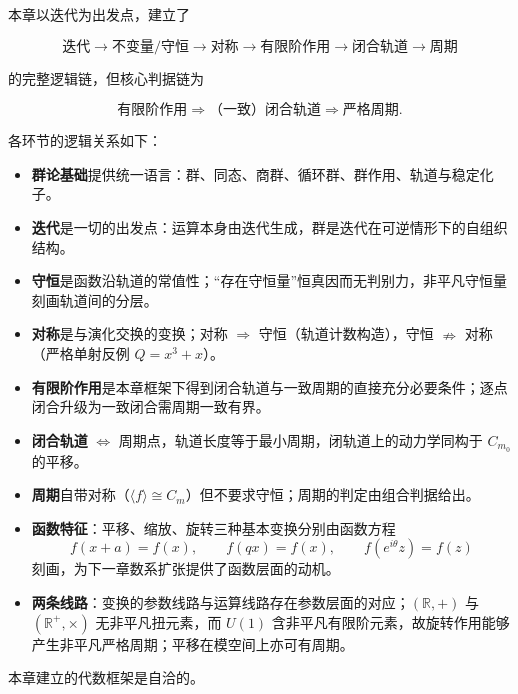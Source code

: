 \begin{remark}[本章总结]\label{rem:chapter_summary}
本章以迭代为出发点，建立了

\[
\text{迭代}\to\text{不变量/守恒}\to\text{对称}\to\text{有限阶作用}\to\text{闭合轨道}\to\text{周期}
\]

的完整逻辑链，但核心判据链为

\[
\text{有限阶作用}\Longrightarrow\text{（一致）闭合轨道}\Longrightarrow\text{严格周期}.
\]

各环节的逻辑关系如下：
\begin{itemize}
    \item \textbf{群论基础}提供统一语言：群、同态、商群、循环群、群作用、轨道与稳定化子。
    \item \textbf{迭代}是一切的出发点：运算本身由迭代生成，群是迭代在可逆情形下的自组织结构。
    \item \textbf{守恒}是函数沿轨道的常值性；“存在守恒量”恒真因而无判别力，非平凡守恒量刻画轨道间的分层。
    \item \textbf{对称}是与演化交换的变换；对称 $\Rightarrow$ 守恒（轨道计数构造），守恒 $\nRightarrow$ 对称（严格单射反例 $Q=x^3+x$）。
    \item \textbf{有限阶作用}是本章框架下得到闭合轨道与一致周期的直接充分必要条件；逐点闭合升级为一致闭合需周期一致有界。
    \item \textbf{闭合轨道} $\iff$ 周期点，轨道长度等于最小周期，闭轨道上的动力学同构于 $C_{m_0}$ 的平移。
    \item \textbf{周期}自带对称（$\langle f\rangle\cong C_m$）但不要求守恒；周期的判定由组合判据给出。
    \item \textbf{函数特征}：平移、缩放、旋转三种基本变换分别由函数方程
    \[
    f(x+a)=f(x),\qquad f(qx)=f(x),\qquad f(e^{i\theta}z)=f(z)
    \]
    刻画，为下一章数系扩张提供了函数层面的动机。
    \item \textbf{两条线路}：变换的参数线路与运算线路存在参数层面的对应；$(\mathbb{R},+)$ 与 $(\mathbb{R}^+,\times)$ 无非平凡扭元素，而 $U(1)$ 含非平凡有限阶元素，故旋转作用能够产生非平凡严格周期；平移在模空间上亦可有周期。
\end{itemize}
本章建立的代数框架是自洽的。
\end{remark}
